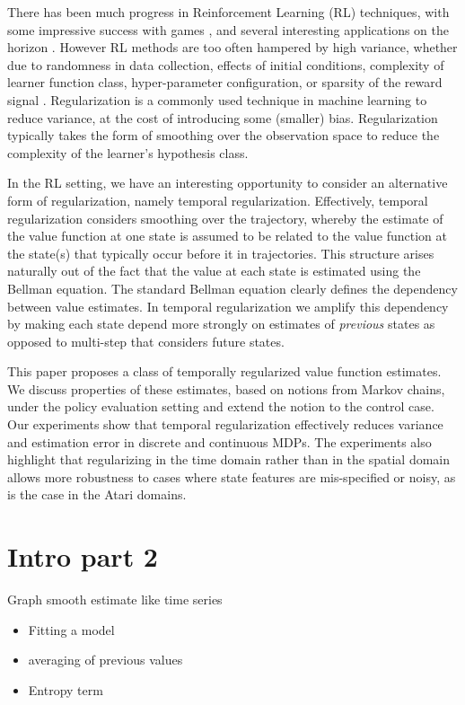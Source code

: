 There has been much progress in Reinforcement Learning (RL) techniques, with some impressive success with games \cite{silver16}, and several interesting applications on the horizon \cite{koedinger18,shortreed11,prasad17,dhingra17}. However RL methods are too often hampered by high variance, whether due to randomness in data collection, effects of initial conditions, complexity of learner function class, hyper-parameter configuration, or sparsity of the reward signal \cite{henderson2017deep}.
Regularization is a commonly used technique in machine learning to reduce variance, at the cost of introducing some (smaller) bias.  Regularization typically takes the form of smoothing over the observation space to reduce the complexity of the learner's hypothesis class.

In the RL setting, we have an interesting opportunity to consider an alternative form of regularization, namely temporal regularization.  Effectively, temporal regularization considers smoothing over the trajectory, whereby the estimate of the value function at one state is assumed to be related to the value function at the state(s) that typically occur before it in trajectories. This structure arises naturally out of the fact that the value at each state is estimated using the Bellman equation. The standard Bellman equation clearly defines the dependency between value estimates. In temporal regularization we amplify this dependency by making each state depend more strongly on estimates of \emph{previous} states as opposed to multi-step that considers future states. 

This paper proposes a class of temporally regularized value function estimates. We discuss properties of these estimates, based on notions from Markov chains, under the policy evaluation setting and extend the notion to the control case.
Our experiments show that temporal regularization effectively reduces variance and estimation error in discrete and continuous MDPs.  The experiments also highlight that regularizing in the time domain rather than in the spatial domain allows more robustness to cases where state features are mis-specified or noisy, as is the case in the Atari domains.

\section{Intro part 2}
Graph smooth estimate like time series
\begin{itemize}
    \item Fitting a model
    \item averaging of previous values
    \item Entropy term 
\end{itemize}